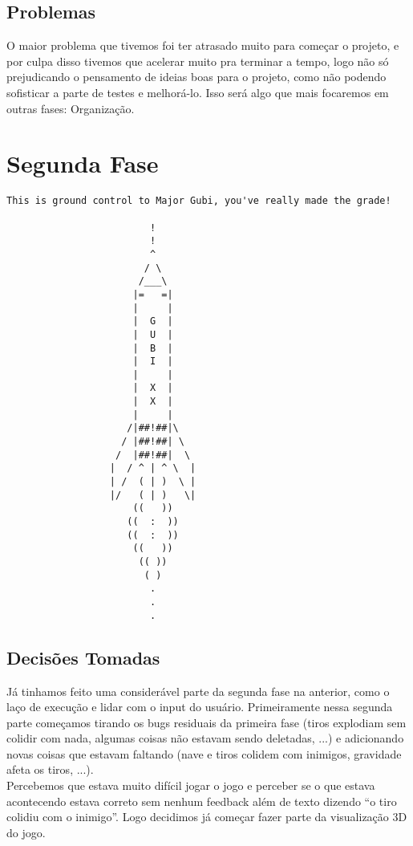 \documentclass[12pt,a4paper]{article}
\begin{document}
    		\subsection{Problemas}
    		O maior problema que tivemos foi ter atrasado muito para começar o projeto, e por culpa disso
		tivemos que acelerar muito pra terminar a tempo, logo não só prejudicando o pensamento de ideias
		boas para o projeto, como não podendo sofisticar a parte de testes e melhorá-lo. Isso será algo
		que mais focaremos em outras fases: Organização.
	
	\newpage
	\section{Segunda Fase}
	\begin{verbatim}
This is ground control to Major Gubi, you've really made the grade!

                         !
                         !
                         ^
                        / \
                       /___\
                      |=   =|
                      |     |
                      |  G  |
                      |  U  |
                      |  B  |
                      |  I  |
                      |     |
                      |  X  |
                      |  X  |
                      |     |
                     /|##!##|\
                    / |##!##| \
                   /  |##!##|  \
                  |  / ^ | ^ \  |
                  | /  ( | )  \ |
                  |/   ( | )   \|
                      ((   ))
                     ((  :  ))
                     ((  :  ))
                      ((   ))
                       (( ))
                        ( )
                         .
                         .
                         .
	\end{verbatim}
		\subsection{Decisões Tomadas}
		Já tinhamos feito uma considerável parte da segunda fase na anterior, como o laço de execução e
		lidar com o input do usuário. Primeiramente nessa segunda parte começamos tirando os bugs residuais
		da primeira fase (tiros explodiam sem colidir com nada, algumas coisas não estavam sendo deletadas, ...) 
		e adicionando novas coisas que estavam faltando (nave e tiros colidem com inimigos, gravidade afeta os
		tiros, ...).\\
		
    		Percebemos que estava muito difícil jogar o jogo e perceber se o que estava acontecendo estava
		correto sem nenhum feedback além de texto dizendo ``o tiro colidiu com o inimigo''. Logo decidimos já começar
		fazer parte da visualização 3D do jogo.\\
		
\end{document}
